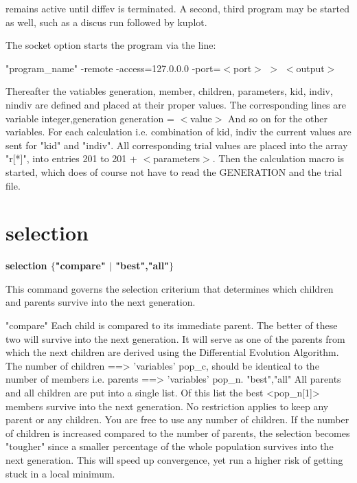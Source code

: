 remains active until diffev is terminated. A second, third program may 
be started as well, such as a discus run followed by kuplot. 
\par
The socket option starts the program via the line: 
\par
"program\_name" -remote -access=127.0.0.0 -port=$ <$port$> $ $> $ $ <$output$> $ 
\par
Thereafter the vatiables generation, member, children, parameters, 
kid, indiv, nindiv are defined and placed at their proper values. 
The corresponding lines are 
variable integer,generation 
generation = $ <$value$> $ 
And so on for the other variables. 
For each calculation i.e. combination of kid, indiv the current 
values are sent for "kid" and "indiv". All corresponding trial 
values are placed into the array "r[*]", into entries 201 to 
201 + $ <$parameters$> $. Then the calculation macro is started, which 
does of course not have to read the GENERATION and the trial file. 
\section{selection}
{\bf selection $ \{$"compare" $| $ "best","all"$\} $ \par }
\par
\vspace{3pt}
This command governs the selection criterium that determines which 
children and parents survive into the next generation. 
\par
\begin{MacVerbatim}
"compare"    Each child is compared to its immediate parent. The better
             of these two will survive into the next generation. It will
             serve as one of the parents from which the next children
             are derived using the Differential Evolution Algorithm.
             The number of children ==> 'variables' pop_c, should be
             identical to the number of members i.e. parents
             ==> 'variables' pop_n.
"best","all" All parents and all children are put into a single list.
             Of this list the best <pop_n[1]> members survive into
             the next generation. No restriction applies to keep any
             parent or any children.
             You are free to use any number of children. If the number of
             children is increased compared to the number of parents, the
             selection becomes "tougher" since a smaller percentage of the
             whole population survives into the next generation. This will
             speed up convergence, yet run a higher risk of getting stuck
             in a local minimum.
\end{MacVerbatim}
